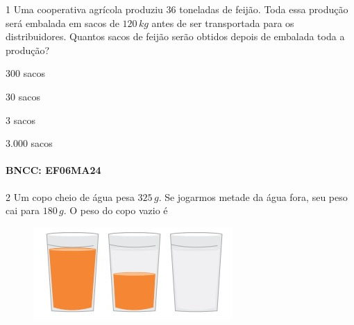 
\num{1}  Uma cooperativa agrícola produziu $36$ toneladas de feijão. Toda essa
produção será embalada em sacos de $120\,kg$ antes de ser transportada para
os distribuidores. Quantos sacos de feijão serão obtidos depois de
embalada toda a produção?

\begin{escolha}
\item $300$ sacos
\item $30$ sacos
\item $3$ sacos
\item $3.000$ sacos
\end{escolha}

\paragraph{BNCC: EF06MA24 }


\num{2}  Um copo cheio de água pesa $325\,g$. Se jogarmos metade da água fora, seu
peso cai para $180\,g$. O peso do copo vazio é

\begin{figure}
\includegraphics[width=2.98958in,height=1.38542in]{./imgSAEB_6_MAT/media/image100.png}
\end{figure}

